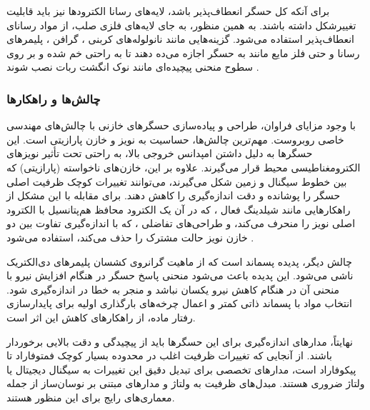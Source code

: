 برای آنکه کل حسگر انعطاف‌پذیر باشد، لایه‌های رسانا الکترودها نیز باید قابلیت تغییرشکل داشته باشند. به همین منظور، به جای لایه‌های فلزی صلب، از مواد رسانای انعطاف‌پذیر استفاده می‌شود. گزینه‌هایی مانند نانولوله‌های کربنی
، 
 گرافن
 ، 
 پلیمرهای رسانا و حتی  فلز مایع مانند 
  به حسگر اجازه می‌ده دهند تا به راحتی خم شده و بر روی سطوح منحنی پیچیده‌ای مانند نوک انگشت  ربات نصب شوند \cite{chi2018recent}.


\subsubsection{چالش‌ها و راهکارها}

با وجود مزایای فراوان، طراحی و پیاده‌سازی حسگرهای خازنی با چالش‌های مهندسی خاصی روبروست. مهم‌ترین چالش‌ها، حساسیت به نویز و خازن پارازیتی است. این حسگرها به دلیل داشتن امپدانس خروجی بالا، به راحتی تحت تأثیر نویزهای الکترومغناطیسی
  محیط قرار می‌گیرند. علاوه بر این، خازن‌های ناخواسته (پارازیتی) که بین خطوط سیگنال و زمین شکل می‌گیرند، می‌توانند تغییرات کوچک ظرفیت اصلی حسگر را پوشانده و دقت اندازه‌گیری را کاهش دهند. برای مقابله با این مشکل از راهکارهایی مانند شیلدینگ فعال
   ،
    که در آن یک الکترود محافظ هم‌پتانسیل با الکترود اصلی نویز را منحرف می‌کند، و طراحی‌های تفاضلی
    ،
  که با اندازه‌گیری تفاوت بین دو خازن نویز حالت مشترک را حذف می‌کند، استفاده می‌شود \cite{tiwana2012review}.

چالش دیگر، پدیده پسماند است که از ماهیت گرانروی کشسان 
پلیمرهای دی‌الکتریک ناشی می‌شود. این پدیده باعث می‌شود منحنی پاسخ حسگر در هنگام افزایش نیرو با منحنی آن در هنگام کاهش نیرو یکسان نباشد و منجر به خطا در اندازه‌گیری شود. انتخاب مواد با پسماند ذاتی کمتر و اعمال چرخه‌های بارگذاری اولیه برای پایدارسازی رفتار ماده، از راهکارهای کاهش این اثر است.

نهایتاً، مدارهای اندازه‌گیری برای این حسگرها باید از پیچیدگی و دقت بالایی برخوردار باشند. از آنجایی که تغییرات ظرفیت اغلب در محدوده بسیار کوچک فمتوفاراد تا پیکوفاراد  است، مدارهای تخصصی برای تبدیل دقیق این تغییرات به سیگنال دیجیتال یا ولتاژ ضروری هستند. مبدل‌های ظرفیت به ولتاژ 
 و مدارهای مبتنی بر نوسان‌ساز
از جمله معماری‌های رایج برای این منظور هستند.



